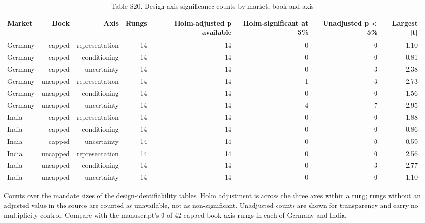 \begin{table}[t]
\centering
\small
\caption{Table S20. Design-axis significance counts by market, book and axis}
\label{tab:s20}
\begin{tabular}{lrrrrrrr}
\toprule
Market & Book & Axis & Rungs & Holm-adjusted p available & Holm-significant at 5\% & Unadjusted p < 5\% & Largest |t| \\
\midrule
Germany & capped & representation & 14 & 14 & 0 & 0 & 1.10 \\
Germany & capped & conditioning & 14 & 14 & 0 & 0 & 0.81 \\
Germany & capped & uncertainty & 14 & 14 & 0 & 3 & 2.38 \\
Germany & uncapped & representation & 14 & 14 & 1 & 3 & 2.73 \\
Germany & uncapped & conditioning & 14 & 14 & 0 & 0 & 1.56 \\
Germany & uncapped & uncertainty & 14 & 14 & 4 & 7 & 2.95 \\
India & capped & representation & 14 & 14 & 0 & 0 & 1.88 \\
India & capped & conditioning & 14 & 14 & 0 & 0 & 0.86 \\
India & capped & uncertainty & 14 & 14 & 0 & 0 & 0.59 \\
India & uncapped & representation & 14 & 14 & 0 & 0 & 2.56 \\
India & uncapped & conditioning & 14 & 14 & 0 & 3 & 2.77 \\
India & uncapped & uncertainty & 14 & 14 & 0 & 0 & 1.10 \\
\bottomrule
\end{tabular}
\par\vspace{2pt}
\parbox{\textwidth}{\footnotesize Counts over the mandate sizes of the design-identifiability tables. Holm adjustment is across the three axes within a rung; rungs without an adjusted value in the source are counted as unavailable, not as non-significant. Unadjusted counts are shown for transparency and carry no multiplicity control. Compare with the manuscript's 0 of 42 capped-book axis-rungs in each of Germany and India.}
\end{table}
